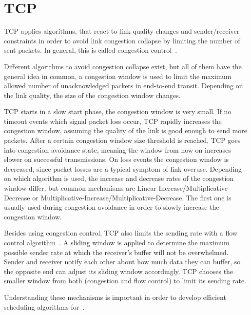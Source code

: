 \section{TCP}
\label{sec:background-tcp}

TCP applies algorithms, that react to link quality changes and sender/receiver constraints in order to avoid link congestion collapse by limiting the number of sent packets. 
In general, this is called congestion control~\cite{RFC-5681}.

Different algorithms to avoid congestion collapse exist, but all of them have the general idea in common, \ie a congestion window is used to limit the maximum allowed number of unacknowledged packets in end-to-end transit. 
Depending on the link quality, the size of the congestion window changes. 

TCP starts in a slow start phase, \ie the congestion window is very small. 
If no timeout events which signal packet loss occur, TCP rapidly increases the congestion window, assuming the quality of the link is good enough to send more packets. 
After a certain congestion window size threshold is reached, TCP goes into congestion avoidance state, meaning the window from now on increases slower on successful transmissions. 
On loss events the congestion window is decreased, since packet losses are a typical symptom of link overuse. 
Depending on which algorithm is used, the increase and decrease rates of the congestion window differ, but common mechanisms are Linear-Increase/Multiplicative-Decrease or Multiplicative-Increase/Multiplicative-Decrease. 
The first one is usually used during congestion avoidance in order to slowly increase the congestion window.

Besides using congestion control, TCP also limits the sending rate with a flow control algorithm~\cite{RFC-793}. 
A sliding window is applied to determine the maximum possible sender rate at which the receiver's buffer will not be overwhelmed. 
Sender and receiver notify each other about how much data they can buffer, so the opposite end can adjust its sliding window accordingly.
TCP chooses the smaller window from both (congestion and flow control) to limit its sending rate.

Understanding these mechanisms is important in order to develop efficient scheduling algorithms for~\mhttp.
